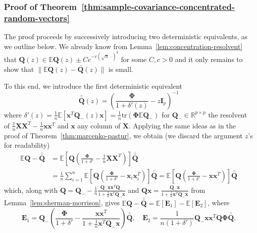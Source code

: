 \documentclass[12pt]{article}
\begin{document}
\subsubsection*{Proof of Theorem~\ref{thm:sample-covariance-concentrated-random-vectors}}
The proof proceeds by successively introducing two deterministic equivalents, as we outline below. We already know from Lemma~\ref{lem:concentration-resolvent} that $\mathbf{Q}(z) \in \mathbb{E}\mathbf{Q}(z) \pm Ce^{-c(\sqrt{n} \cdot)^q}$ for some $C, c > 0$ and it only remains to show that $\|\mathbb{E}\mathbf{Q}(z) - \bar{\mathbf{Q}}(z)\|$ is small.

To this end, we introduce the first deterministic equivalent
\begin{equation}
\bar{\bar{\mathbf{Q}}}(z) = \left(\frac{\boldsymbol{\Phi}}{1 + \delta'(z)} - z\mathbf{I}_p\right)^{-1}
\end{equation}
where $\delta'(z) = \frac{1}{n}\mathbb{E}[\mathbf{x}^T\mathbf{Q}_-(z)\mathbf{x}] = \frac{1}{n}\text{tr}(\boldsymbol{\Phi}\mathbb{E}\mathbf{Q}_-)$ for $\mathbf{Q}_- \in \mathbb{R}^{p \times p}$ the resolvent of $\frac{1}{n}\mathbf{X}\mathbf{X}^T - \frac{1}{n}\mathbf{x}\mathbf{x}^T$ and $\mathbf{x}$ any column of $\mathbf{X}$. Applying the same ideas as in the proof of Theorem~\ref{thm:marcenko-pastur}, we obtain (we discard the argument $z$'s for readability)
\begin{align*}
\mathbb{E}\mathbf{Q} - \bar{\bar{\mathbf{Q}}} &= \mathbb{E}\left[\mathbf{Q}\left(\frac{\boldsymbol{\Phi}}{1 + \delta'} - \frac{1}{n}\mathbf{X}\mathbf{X}^T\right)\right]\bar{\bar{\mathbf{Q}}} \\
&= \frac{1}{n}\sum_{i=1}^n \mathbb{E}\left[\mathbf{Q}\left(\frac{\boldsymbol{\Phi}}{1 + \delta'} - \mathbf{x}_i\mathbf{x}_i^T\right)\right]\bar{\bar{\mathbf{Q}}}= \mathbb{E}\left[\mathbf{Q}\left(\frac{\boldsymbol{\Phi}}{1 + \delta'} - \mathbf{x}\mathbf{x}^T\right)\right]\bar{\bar{\mathbf{Q}}}
\end{align*}
which, along with $\mathbf{Q} = \mathbf{Q}_- - \frac{1}{n}\frac{\mathbf{Q}_-\mathbf{x}\mathbf{x}^T\mathbf{Q}_-}{1 + \frac{1}{n}\mathbf{x}^T\mathbf{Q}_-\mathbf{x}}$ and $\mathbf{Q}\mathbf{x} = \frac{\mathbf{Q}_-\mathbf{x}}{1 + \frac{1}{n}\mathbf{x}^T\mathbf{Q}_-\mathbf{x}}$ from Lemma~\ref{lem:sherman-morrison}, gives $\mathbb{E}\mathbf{Q} - \bar{\bar{\mathbf{Q}}} = \mathbb{E}[\mathbf{E}_1] - \mathbb{E}[\mathbf{E}_2]$, where
\begin{equation*}
\mathbf{E}_1 = \mathbf{Q}_-\left(\frac{\boldsymbol{\Phi}}{1 + \delta'} - \frac{\mathbf{x}\mathbf{x}^T}{1 + \frac{1}{n}\mathbf{x}^T\mathbf{Q}_-\mathbf{x}}\right)\bar{\bar{\mathbf{Q}}}, \quad \mathbf{E}_2 = \frac{1}{n(1 + \delta')}\mathbf{Q}_-\mathbf{x}\mathbf{x}^T\mathbf{Q}\boldsymbol{\Phi}\bar{\bar{\mathbf{Q}}}.
\end{equation*}
\end{document}
